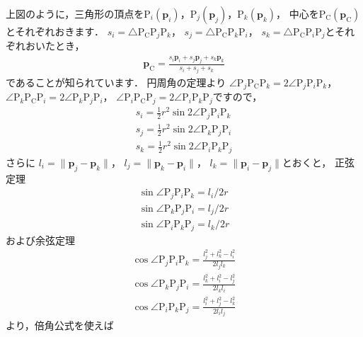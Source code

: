 ﻿\documentclass[a4paper]{jsarticle}
\begin{document}
上図のように，三角形の頂点を$\mathrm{P}_{i}(\boldsymbol{p}_{i})$，$\mathrm{P}_{j}(\boldsymbol{p}_{j})$，$\mathrm{P}_{k}(\boldsymbol{p}_{k})$，
中心を$\mathrm{P}_{\mathrm{C}}(\boldsymbol{p}_{\mathrm{C}})$とそれぞれおきます．
$s_{i}=\triangle\mathrm{P}_{\mathrm{C}}\mathrm{P}_{j}\mathrm{P}_{k}$，
$s_{j}=\triangle\mathrm{P}_{\mathrm{C}}\mathrm{P}_{k}\mathrm{P}_{i}$，
$s_{k}=\triangle\mathrm{P}_{\mathrm{C}}\mathrm{P}_{i}\mathrm{P}_{j}$とそれぞれおいたとき，
\begin{align*}
\boldsymbol{p}_{\mathrm{C}}=\frac{s_{i}\boldsymbol{p}_{i}+s_{j}\boldsymbol{p}_{j}+s_{k}\boldsymbol{p}_{k}}{s_{i}+s_{j}+s_{k}}
\end{align*}
であることが知られています．
円周角の定理より
$\angle\mathrm{P}_{j}\mathrm{P}_{\mathrm{C}}\mathrm{P}_{k}=2\angle\mathrm{P}_{j}\mathrm{P}_{i}\mathrm{P}_{k}$，
$\angle\mathrm{P}_{k}\mathrm{P}_{\mathrm{C}}\mathrm{P}_{i}=2\angle\mathrm{P}_{k}\mathrm{P}_{j}\mathrm{P}_{i}$，
$\angle\mathrm{P}_{i}\mathrm{P}_{\mathrm{C}}\mathrm{P}_{j}=2\angle\mathrm{P}_{i}\mathrm{P}_{k}\mathrm{P}_{j}$ですので，
\begin{align*}
s_{i}=\frac{1}{2}r^{2}\sin 2\angle\mathrm{P}_{j}\mathrm{P}_{i}\mathrm{P}_{k}
\\
s_{j}=\frac{1}{2}r^{2}\sin 2\angle\mathrm{P}_{k}\mathrm{P}_{j}\mathrm{P}_{i}
\\
s_{k}=\frac{1}{2}r^{2}\sin 2\angle\mathrm{P}_{i}\mathrm{P}_{k}\mathrm{P}_{j}
\end{align*}
さらに
$l_{i}=\|\boldsymbol{p}_{j}-\boldsymbol{p}_{k}\|$，
$l_{j}=\|\boldsymbol{p}_{k}-\boldsymbol{p}_{i}\|$，
$l_{k}=\|\boldsymbol{p}_{i}-\boldsymbol{p}_{j}\|$とおくと，
正弦定理
\begin{align*}
\sin\angle\mathrm{P}_{j}\mathrm{P}_{i}\mathrm{P}_{k}=l_{i}/2r
\\
\sin\angle\mathrm{P}_{k}\mathrm{P}_{j}\mathrm{P}_{i}=l_{j}/2r
\\
\sin\angle\mathrm{P}_{i}\mathrm{P}_{k}\mathrm{P}_{j}=l_{k}/2r
\end{align*}
および余弦定理
\begin{align*}
\cos\angle\mathrm{P}_{j}\mathrm{P}_{i}\mathrm{P}_{k}=\frac{l_{j}^{2}+l_{k}^{2}-l_{i}^{2}}{2l_{j}l_{k}}
\\
\cos\angle\mathrm{P}_{k}\mathrm{P}_{j}\mathrm{P}_{i}=\frac{l_{k}^{2}+l_{i}^{2}-l_{j}^{2}}{2l_{k}l_{i}}
\\
\cos\angle\mathrm{P}_{i}\mathrm{P}_{k}\mathrm{P}_{j}=\frac{l_{i}^{2}+l_{j}^{2}-l_{k}^{2}}{2l_{i}l_{j}}
\end{align*}
より，倍角公式を使えば
\end{document}
